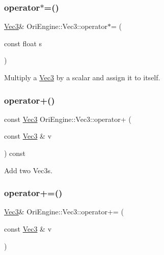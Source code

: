\hypertarget{struct_ori_engine_1_1_vec3_a93473080cc10ee1c3554a9557d467215}{}\label{struct_ori_engine_1_1_vec3_a93473080cc10ee1c3554a9557d467215} 
\subsubsection{\texorpdfstring{operator$\ast$=()}{operator*=()}}
{\footnotesize\ttfamily \hyperlink{struct_ori_engine_1_1_vec3}{Vec3}\& Ori\+Engine\+::\+Vec3\+::operator$\ast$= (\begin{DoxyParamCaption}\item[{const float}]{s }\end{DoxyParamCaption})\hspace{0.3cm}{\ttfamily [inline]}}



Multiply a \hyperlink{struct_ori_engine_1_1_vec3}{Vec3} by a scalar and assign it to itself. 

\hypertarget{struct_ori_engine_1_1_vec3_a68b3819fa6b6b9ddb2d6c1d75caa0d41}{}\label{struct_ori_engine_1_1_vec3_a68b3819fa6b6b9ddb2d6c1d75caa0d41} 
\subsubsection{\texorpdfstring{operator+()}{operator+()}}
{\footnotesize\ttfamily const \hyperlink{struct_ori_engine_1_1_vec3}{Vec3} Ori\+Engine\+::\+Vec3\+::operator+ (\begin{DoxyParamCaption}\item[{const \hyperlink{struct_ori_engine_1_1_vec3}{Vec3} \&}]{v }\end{DoxyParamCaption}) const\hspace{0.3cm}{\ttfamily [inline]}}



Add two Vec3s. 

\hypertarget{struct_ori_engine_1_1_vec3_a1f77d29a453dfdf1fc75290e2824b42e}{}\label{struct_ori_engine_1_1_vec3_a1f77d29a453dfdf1fc75290e2824b42e} 
\subsubsection{\texorpdfstring{operator+=()}{operator+=()}}
{\footnotesize\ttfamily \hyperlink{struct_ori_engine_1_1_vec3}{Vec3}\& Ori\+Engine\+::\+Vec3\+::operator+= (\begin{DoxyParamCaption}\item[{const \hyperlink{struct_ori_engine_1_1_vec3}{Vec3} \&}]{v }\end{DoxyParamCaption})\hspace{0.3cm}{\ttfamily [inline]}}



